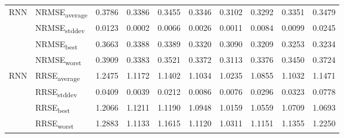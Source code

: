 {\begin{longtable}{l l c c c c c c c c}
\cmidrule(lr){2-10}
\multirow{4}{*}{RNN} & NRMSE\textsubscript{average} & 0.3786 & 0.3386 & 0.3455 & 0.3346 & 0.3102 & 0.3292 & 0.3351 & 0.3479 \\
 & NRMSE\textsubscript{stddev} & 0.0123 & 0.0002 & 0.0066 & 0.0026 & 0.0011 & 0.0084 & 0.0099 & 0.0245 \\
 & NRMSE\textsubscript{best} & 0.3663 & 0.3388 & 0.3389 & 0.3320 & 0.3090 & 0.3209 & 0.3253 & 0.3234 \\
 & NRMSE\textsubscript{worst} & 0.3909 & 0.3383 & 0.3521 & 0.3372 & 0.3113 & 0.3376 & 0.3450 & 0.3724 \\
\cmidrule(lr){2-10}
\multirow{4}{*}{RNN} & RRSE\textsubscript{average} & 1.2475 & 1.1172 & 1.1402 & 1.1034 & 1.0235 & 1.0855 & 1.1032 & 1.1471 \\
 & RRSE\textsubscript{stddev} & 0.0409 & 0.0039 & 0.0212 & 0.0086 & 0.0076 & 0.0296 & 0.0323 & 0.0778 \\
 & RRSE\textsubscript{best} & 1.2066 & 1.1211 & 1.1190 & 1.0948 & 1.0159 & 1.0559 & 1.0709 & 1.0693 \\
 & RRSE\textsubscript{worst} & 1.2883 & 1.1133 & 1.1615 & 1.1120 & 1.0311 & 1.1151 & 1.1355 & 1.2250 \\
\cmidrule(lr){2-10}
\end{longtable}
}